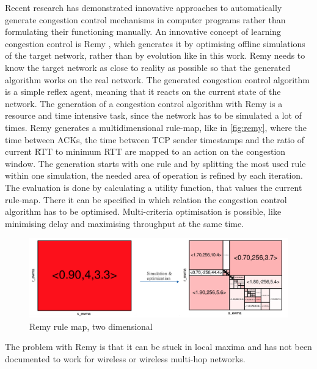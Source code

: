 Recent research has demonstrated innovative approaches to automatically generate congestion control mechanisms in computer programs rather than formulating their functioning manually. An innovative concept of learning congestion control is Remy \cite{remy}, which generates it by optimising offline simulations of the target network, rather than by evolution like in this work. Remy needs to know the target network as close to reality as possible so that the generated algorithm works on the real network. The generated congestion control algorithm is a simple reflex agent, meaning that it reacts on the current state of the network. The generation of a congestion control algorithm with Remy is a resource and time intensive task, since the network has to be simulated a lot of times. Remy generates a multidimensional rule-map, like in \autoref{fig:remy}, where the time between ACKs, the time between TCP sender timestamps and the ratio of current RTT to minimum RTT are mapped to an action on the congestion window. The generation starts with one rule and by splitting the most used rule within one simulation, the needed area of operation is refined by each iteration. The evaluation is done by calculating a utility function, that values the current rule-map. There it can be specified in which relation the congestion control algorithm has to be optimised. Multi-criteria optimisation is possible, like minimising delay and maximising throughput at the same time. 
\begin{figure}
	\includegraphics[width=1\linewidth]{remygraphic}
	\caption{Remy rule map, two dimensional \cite{remySlides}}
	\label{fig:remy}
\end{figure}
The problem with Remy is that it can be stuck in local maxima and has not been documented to work for wireless or wireless multi-hop networks. 
\\ \\

